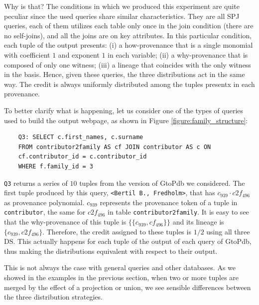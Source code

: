 Why is that?  The conditions in which we produced this experiment are quite peculiar since the used queries  share similar characteristics. They are all SPJ queries, each of them utilizes each table only once in the join condition (there are no self-joins), and all the joins are on key attributes. 
In this particular condition, each tuple of the output presents: (i) a how-provenance that is a single monomial with coefficient $1$ and exponent $1$ in each variable; (ii) a why-provenance that is composed of only one witness; (iii) a lineage that coincides with the only witness in the basis.
Hence, given these queries, the three distributions act in the same way.
The credit is always uniformly distributed among the tuples presentx in each provenance. 

To better clarify what is happening, let us consider one of the types of queries used to build the output webpage, as shown in Figure \ref{figure:family_structure}:

\vspace{2mm}
{\footnotesize
\begin{adjustwidth}{25pt}{5pt}
	\begin{verbatim}
	Q3: SELECT c.first_names, c.surname
	FROM contributor2family AS cf JOIN contributor AS c ON 
	cf.contributor_id = c.contributor_id 
	WHERE f.family_id = 3
\end{verbatim}
\end{adjustwidth}
}
\vspace{2mm}

\texttt{Q3} returns a series of $10$ tuples from the version of GtoPdb we considered. 
The first tuple produced by this query, \texttt{<Bertil B., Fredholm>}, that has $c_{939} \cdot c2f_{496}$ as provenance polynomial.
$c_{939}$ represents the provenance token of a tuple in \texttt{contributor}, the same for $c2f_{496}$ in table \texttt{contributor2family}. 
It is easy to see that the why-provenance of this tuple is $\{\{c_{939}, cf_{496} \}\}$ and its lineage is $\{c_{939}, c2f_{496} \}$.
Therefore, the credit assigned to these tuples is $1/2$ using all three DS.
This actually happens for each tuple of the output of each query of GtoPdb, thus making the distributions equivalent with respect to their output.

This is not always the case with general queries and other databases. As we showed in the examples in the previous section, when two or more tuples are merged by the effect of a projection or union, we see sensible differences between the three distribution strategies. %

